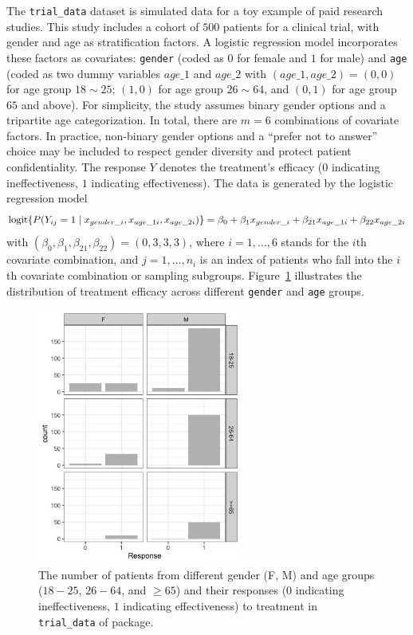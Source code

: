 The \texttt{trial\_data} dataset is simulated data for a toy example of paid research studies. This study includes a cohort of $500$ patients for a clinical trial, with gender and age as stratification factors. A logistic regression model incorporates these factors as covariates: {\tt gender} (coded as $0$ for female and $1$ for male) and {\tt age} (coded as two dummy variables $age\_1$ and $age\_2$ with $(age\_1, age\_2) = (0, 0)$ for age group $18\sim25$; $(1, 0)$ for age group $26\sim64$, and $(0, 1)$ for age group $65$ and above). For simplicity, the study assumes binary gender options and a tripartite age categorization. In total, there are $m=6$ combinations of covariate factors. In practice, non-binary gender options and a ``prefer not to answer'' choice may be included to respect gender diversity and protect patient confidentiality. The response $Y$ denotes the treatment's efficacy ($0$ indicating ineffectiveness, $1$ indicating effectiveness). The data is generated by the logistic regression model
\begin{equation}\label{eq:trial_logistic_model}
{\rm logit} \{P(Y_{ij}=1 \mid x_{gender\_i}, x_{age\_1i}, x_{age\_2i})\} = \beta_0 + \beta_1 x_{gender\_i} + \beta_{21} x_{age\_1i} + \beta_{22} x_{age\_2i}
\end{equation}
with $(\beta_0, \beta_1, \beta_{21}, \beta_{22}) = (0,3,3,3)$, where $i=1, \ldots, 6$ stands for the $i$th covariate combination, and $j = 1, \ldots, n_i$ is an index of patients who fall into the $i$th covariate combination or sampling subgroups. Figure~\ref{fig:trial_data} illustrates the distribution of treatment efficacy across different {\tt gender} and {\tt age} groups.

\begin{figure}[htb!]
    \centering
    \includegraphics[width=0.6\textwidth]{figures/trial_data.png}
    \caption{The number of patients from different gender (F, M) and age groups ($18-25$, $26-64$, and $\ge 65$) and their responses  ($0$ indicating ineffectiveness, $1$ indicating effectiveness) to treatment in \texttt{trial\_data} of  package.}
    \label{fig:trial_data}
\end{figure}

